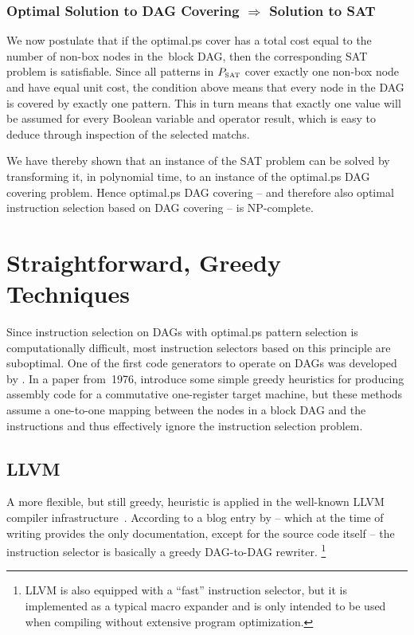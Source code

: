 \subsubsection{Optimal Solution to DAG Covering $\Rightarrow$ Solution to SAT}

We now postulate that if the \gls{optimal.ps} cover has a total cost equal to
the number of non-\glspl{box node} in the~\gls{block DAG}, then the
corresponding \gls{SAT} problem is satisfiable.
%
Since all \glspl{pattern} in $\mPSat$ cover exactly one non-\gls{box node} and
have equal unit cost, the condition above means that every \gls{node} in the
\gls{DAG} is covered by exactly one \gls{pattern}.
%
This in turn means that exactly one value will be assumed for every Boolean
variable and operator result, which is easy to deduce through inspection of the
selected \glspl{match}.

We have thereby shown that an instance of the \gls{SAT} problem can be solved by
transforming it, in polynomial time, to an instance of the \gls{optimal.ps}
\gls{DAG covering} problem.
%
Hence \gls{optimal.ps} \gls{DAG covering} -- and therefore also optimal
\gls{instruction selection} based on \gls{DAG covering} -- is NP-complete.
%
\hfill\qedsymbol


\section{Straightforward, Greedy Techniques}

Since \gls{instruction selection} on \glspl{DAG} with \gls{optimal.ps}
\gls{pattern selection} is computationally difficult, most \glspl{instruction
  selector} based on this \gls{principle} are suboptimal.
%
One of the first \glspl{code generator} to operate on \glspl{DAG} was developed
by \textcite{Aho1976b}.
%
In a paper from~1976, \citeauthor{Aho1976b} introduce some simple greedy
heuristics for producing \gls{assembly code} for a commutative
one-\gls{register} \gls{target machine}, but these methods assume a one-to-one
mapping between the \glspl{node} in a \gls{block DAG} and the
\glspl{instruction} and thus effectively ignore the \gls{instruction selection}
problem.


\subsection{LLVM}

A more flexible, but still greedy, heuristic is applied in the well-known
\gls{LLVM} \gls{compiler} infrastructure~\cite{Lattner2004}.
%
According to a blog entry by \textcite{Bendersky2013} -- which at the time of
writing provides the only documentation, except for the source code itself --
the \gls{instruction selector} is basically a greedy
\mbox{\gls{DAG}-to-\gls{DAG}} rewriter.\!%
%
\footnote{%
  \gls{LLVM} is also equipped with a ``fast'' \gls{instruction selector}, but it
  is implemented as a typical \gls{macro expander} and is only intended to be
  used when compiling without extensive \gls{program} optimization.%
}

